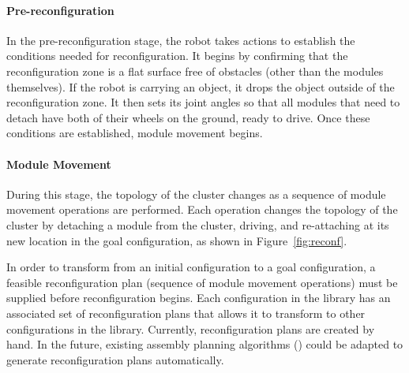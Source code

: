 \documentclass[conference]{IEEEtran}
\begin{document}
\paragraph{Pre-reconfiguration} In the pre-reconfiguration stage, the robot takes actions to establish the conditions needed for reconfiguration.  It begins by confirming that the reconfiguration zone is a flat surface free of obstacles (other than the modules themselves).  If the robot is carrying an object, it drops the object outside of the reconfiguration zone. It then  sets its joint angles so that all modules that need to detach have both of their wheels on the ground, ready to drive. Once these conditions are established, module movement begins.

\paragraph{Module Movement} During this stage, the topology of the cluster changes as a sequence of module movement operations are performed.  Each operation changes the topology of the cluster by detaching a module from the cluster, driving, and re-attaching at its new location in the goal configuration, as shown in Figure~\ref{fig:reconf}.

In order to transform from an initial configuration to a goal configuration, a feasible reconfiguration plan (sequence of module movement operations) must be supplied before reconfiguration begins.  Each configuration in the library has an associated set of reconfiguration plans that allows it to transform to other configurations in the library.  Currently, reconfiguration plans are created by hand.  In the future, existing assembly planning algorithms (\cite{Werfel2007,Seo2013}) could be adapted to generate reconfiguration plans automatically.

\end{document}
